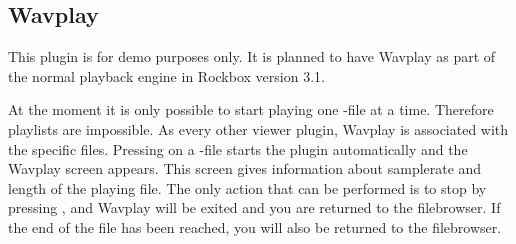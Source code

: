 \subsection{Wavplay}
This plugin is for demo purposes only. It is planned to have 
Wavplay as part of the normal playback engine in Rockbox version 3.1.

At the moment it is only possible to start playing one -file at a 
time. Therefore playlists are impossible. As every other viewer plugin, Wavplay
is associated with the specific files.  Pressing \ButtonPlay{} on a 
-file starts the plugin automatically and the Wavplay screen 
appears. This screen gives information about samplerate and length of the 
playing file. 
The only action that can be performed is to stop by pressing \ButtonOff, and 
Wavplay will be exited and you are returned to the  filebrowser. If the end of 
the file has been reached, you will also be returned to the filebrowser.